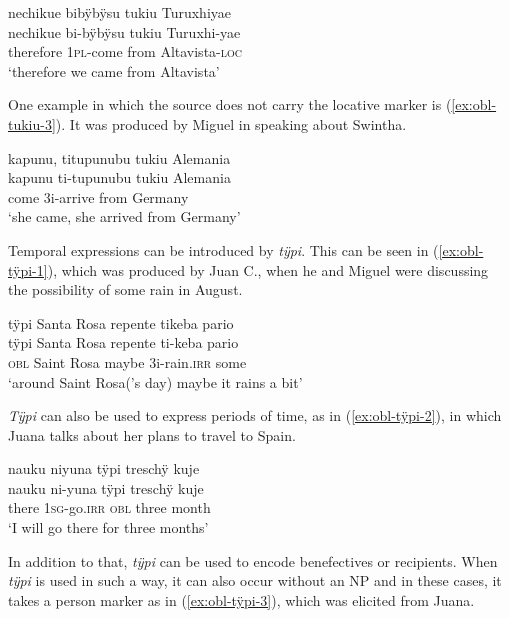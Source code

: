 \ea\label{ex:obl-tukiu-2}
\begingl
\glpreamble nechikue bibÿbÿsu tukiu Turuxhiyae\\
\gla nechikue bi-bÿbÿsu tukiu Turuxhi-yae\\
\glb therefore 1\textsc{pl}-come from Altavista-\textsc{loc}\\
\glft ‘therefore we came from Altavista’
\endgl
\trailingcitation{[mqx-p110826l.018]}
\xe

One example in which the source does not carry the locative marker is (\ref{ex:obl-tukiu-3}). It was produced by Miguel in speaking about Swintha.

\ea\label{ex:obl-tukiu-3}
\begingl
\glpreamble kapunu, titupunubu tukiu Alemania\\
\gla kapunu ti-tupunubu tukiu Alemania\\
\glb come 3i-arrive from Germany\\
\glft ‘she came, she arrived from Germany’
\endgl
\trailingcitation{[mxx-d110813s-2.028]}
\xe
{}

Temporal expressions can be introduced by \textit{tÿpi}. This can be seen in (\ref{ex:obl-tÿpi-1}), which was produced by Juan C., when he and Miguel were discussing the possibility of some rain in August.

\ea\label{ex:obl-tÿpi-1}
\begingl
\glpreamble tÿpi Santa Rosa repente tikeba pario\\
\gla tÿpi {Santa Rosa} repente ti-keba pario\\
\glb \textsc{obl} {Saint Rosa} maybe 3i-rain.\textsc{irr} some\\
\glft ‘around Saint Rosa(’s day) maybe it rains a bit’
\endgl
\trailingcitation{[mqx-p110826l.627]}
\xe

\textit{Tÿpi} can also be used to express periods of time, as in (\ref{ex:obl-tÿpi-2}), in which Juana talks about her plans to travel to Spain.

\ea\label{ex:obl-tÿpi-2}
\begingl
\glpreamble nauku niyuna tÿpi treschÿ kuje\\
\gla nauku ni-yuna tÿpi treschÿ kuje\\
\glb there 1\textsc{sg}-go.\textsc{irr} \textsc{obl} three month\\
\glft ‘I will go there for three months’
\endgl
\trailingcitation{[jxx-p110923l-1.260-261]}
\xe

In addition to that, \textit{tÿpi} can be used to encode benefectives or recipients. When \textit{tÿpi} is used in such a way, it can also occur without an NP and in these cases, it takes a person marker as in (\ref{ex:obl-tÿpi-3}), which was elicited from Juana.

